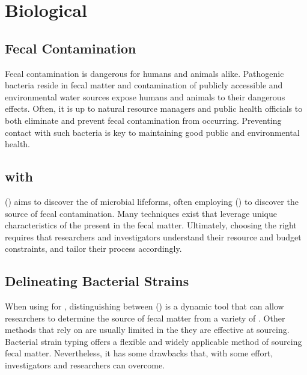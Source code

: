\section{Biological}
\subsection{Fecal Contamination}
Fecal contamination is dangerous for humans and animals alike.
Pathogenic bacteria reside in fecal matter and contamination of publicly accessible and environmental water sources expose humans and animals to their dangerous effects.
Often, it is up to natural resource managers and public health officials to both eliminate and prevent fecal contamination from occurring.
Preventing contact with such bacteria is key to maintaining good public and environmental health.



\subsection{\MSTlong{} with \FIBlong{}}
\MSTlong{} (\mst{}) aims to discover the \spec{} of microbial lifeforms, often employing \FIBlong{} (\fib{}) to discover the source of fecal contamination.
Many techniques exist that leverage unique characteristics of the \fib{} present in the fecal matter.
Ultimately, choosing the right \fib{} requires that researchers and investigators understand their resource and budget constraints, and tailor their \mst{} process accordingly.

\subsection{Delineating Bacterial Strains}
When using \fib{} for \mst{}, distinguishing between \bslongs{} (\bs{}) is a dynamic tool that can allow researchers to determine the source of fecal matter from a variety of \spec{}.
Other methods that rely on \mst{} are usually limited in the \spec{} they are effective at sourcing.
Bacterial strain typing offers a flexible and widely applicable method of sourcing fecal matter.
Nevertheless, it has some drawbacks that, with some effort, \mst{} investigators and researchers can overcome.